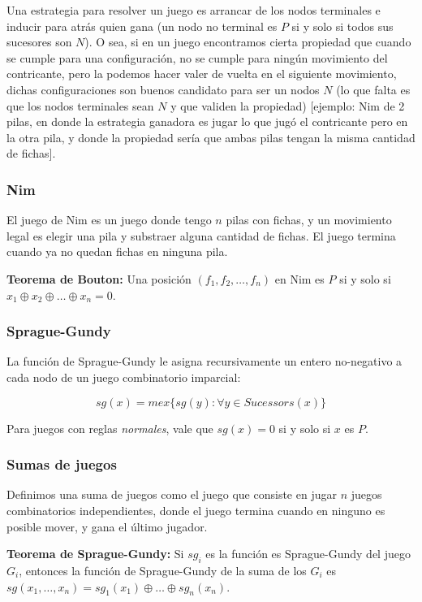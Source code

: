 Una estrategia para resolver un juego es arrancar de los nodos
terminales e inducir para atrás quien gana (un nodo no terminal es $P$ si y solo
si todos sus sucesores son $N$). O sea, si en un juego encontramos cierta
propiedad que cuando se cumple para una configuración, no se cumple para ningún
movimiento del contricante, pero la podemos hacer valer de vuelta en el
siguiente movimiento, dichas configuraciones son buenos candidato para ser un
nodos $N$ (lo que falta es que los nodos terminales sean $N$ y que validen la
propiedad) [ejemplo: Nim de 2 pilas, en donde la estrategia ganadora es jugar lo
que jugó el contricante pero en la otra pila, y donde la propiedad sería que
ambas pilas tengan la misma cantidad de fichas].

\subsubsection*{Nim}

El juego de Nim es un juego donde tengo $n$ pilas con fichas, y un movimiento
legal es elegir una pila y substraer alguna cantidad de fichas. El juego termina
cuando ya no quedan fichas en ninguna pila.

\textbf{Teorema de Bouton:} Una posición $(f_1, f_2, \dots, f_n)$ en Nim es $P$
si y solo si $x_1 \oplus x_2 \oplus \dots \oplus x_n = 0$. 



\subsubsection*{Sprague-Gundy}

La función de Sprague-Gundy le asigna recursivamente un entero no-negativo a
cada nodo de un juego combinatorio imparcial:

\begin{equation*}
    sg(x) = mex \{ sg(y) : \forall y \in Sucessors(x) \}
\end{equation*}

Para juegos con reglas \textit{normales}, vale que $sg(x) = 0$ si y solo si $x$
es $P$.

\subsubsection*{Sumas de juegos}

Definimos una suma de juegos como el juego que consiste en jugar $n$ juegos
combinatorios independientes, donde el juego termina cuando en ninguno es
posible mover, y gana el último jugador.

\textbf{Teorema de Sprague-Gundy:} Si $sg_i$ es la función es Sprague-Gundy del
juego $G_i$, entonces la función de Sprague-Gundy de la suma de los $G_i$ es
$sg(x_1, \dots, x_n) = sg_1(x_1) \oplus \dots \oplus sg_n(x_n)$.





